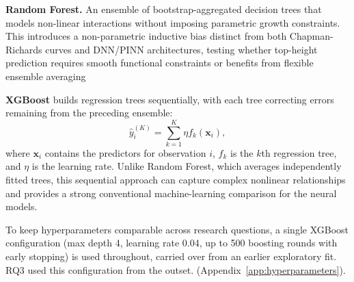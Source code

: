 \textbf{Random Forest.} An ensemble of bootstrap-aggregated decision trees that models non-linear interactions without imposing parametric growth constraints. This introduces a non-parametric inductive bias distinct from both Chapman-Richards curves and DNN/PINN architectures, testing whether top-height prediction requires smooth functional constraints or benefits from flexible ensemble averaging \cite{lee2018Machine_C3_LID}

\textbf{XGBoost} builds regression trees sequentially, with each tree correcting errors remaining from the preceding ensemble:
\begin{equation}
\hat{y}_i^{(K)} = \sum_{k=1}^{K}\eta f_k(\mathbf{x}_i),
\end{equation}
where $\mathbf{x}_i$ contains the predictors for observation $i$, $f_k$ is the $k$th regression tree, and $\eta$ is the learning rate. Unlike Random Forest, which averages independently fitted trees, this sequential approach can capture complex nonlinear relationships and provides a strong conventional machine-learning comparison for the neural models.

To keep hyperparameters comparable across research questions, a single XGBoost configuration (max depth 4, learning rate 0.04, up to 500 boosting rounds with early stopping) is used throughout, carried over from an earlier exploratory fit. RQ3 used this configuration from the outset.  (Appendix~\ref{app:hyperparameters}).


